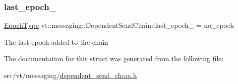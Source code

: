 \subsubsection{\texorpdfstring{last\+\_\+epoch\+\_\+}{last\_epoch\_}}
{\footnotesize\ttfamily \hyperlink{namespacevt_a985a5adf291c34a3ca263b3378388236}{Epoch\+Type} vt\+::messaging\+::\+Dependent\+Send\+Chain\+::last\+\_\+epoch\+\_\+ = no\+\_\+epoch\hspace{0.3cm}{\ttfamily [private]}}

The last epoch added to the chain 

The documentation for this struct was generated from the following file\+:\begin{DoxyCompactItemize}
\item 
src/vt/messaging/\hyperlink{dependent__send__chain_8h}{dependent\+\_\+send\+\_\+chain.\+h}\end{DoxyCompactItemize}
